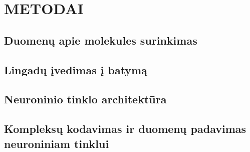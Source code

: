 
\section{METODAI}

\subsection{Duomenų apie molekules surinkimas}

\subsection{Lingadų įvedimas į batymą}


\subsection{Neuroninio tinklo architektūra}

\subsection{Kompleksų kodavimas ir duomenų padavimas neuroniniam tinklui}






